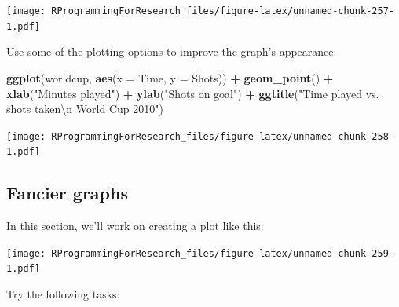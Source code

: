 \documentclass[]{book}
\makeatletter
\newenvironment{Shaded}{\begin{snugshade}}{\end{snugshade}}
\newcommand{\KeywordTok}[1]{\textcolor[rgb]{0.13,0.29,0.53}{\textbf{#1}}}
\newcommand{\DataTypeTok}[1]{\textcolor[rgb]{0.13,0.29,0.53}{#1}}
\newcommand{\CharTok}[1]{\textcolor[rgb]{0.31,0.60,0.02}{#1}}
\newcommand{\StringTok}[1]{\textcolor[rgb]{0.31,0.60,0.02}{#1}}
\newcommand{\OperatorTok}[1]{\textcolor[rgb]{0.81,0.36,0.00}{\textbf{#1}}}
\newcommand{\NormalTok}[1]{#1}
\newenvironment{kframe}{%
\medskip{}
\setlength{\fboxsep}{.8em}
 \def\at@end@of@kframe{}%
 \ifinner\ifhmode%
  \def\at@end@of@kframe{\end{minipage}}%
  \begin{minipage}{\columnwidth}%
 \fi\fi%
 \def\FrameCommand##1{\hskip\@totalleftmargin \hskip-\fboxsep
 \colorbox{shadecolor}{##1}\hskip-\fboxsep
     \hskip-\linewidth \hskip-\@totalleftmargin \hskip\columnwidth}%
 \MakeFramed {\advance\hsize-\width
   \@totalleftmargin\z@ \linewidth\hsize
   \@setminipage}}%
 {\par\unskip\endMakeFramed%
 \at@end@of@kframe}
\renewenvironment{Shaded}{\begin{kframe}}{\end{kframe}}
\theoremstyle{definition}
\theoremstyle{definition}
\theoremstyle{definition}
\theoremstyle{remark}
\makeatother
\begin{document}
\texttt{[image: RProgrammingForResearch\_files/figure-latex/unnamed-chunk-257-1.pdf]}

Use some of the plotting options to improve the graph's appearance:

\begin{Shaded}
\begin{Highlighting}[]
\KeywordTok{ggplot}\NormalTok{(worldcup, }\KeywordTok{aes}\NormalTok{(}\DataTypeTok{x =}\NormalTok{ Time, }\DataTypeTok{y =}\NormalTok{ Shots)) }\OperatorTok{+}\StringTok{ }
\StringTok{  }\KeywordTok{geom_point}\NormalTok{() }\OperatorTok{+}\StringTok{ }
\StringTok{  }\KeywordTok{xlab}\NormalTok{(}\StringTok{"Minutes played"}\NormalTok{) }\OperatorTok{+}\StringTok{ }
\StringTok{  }\KeywordTok{ylab}\NormalTok{(}\StringTok{"Shots on goal"}\NormalTok{) }\OperatorTok{+}\StringTok{ }
\StringTok{  }\KeywordTok{ggtitle}\NormalTok{(}\StringTok{"Time played vs. shots taken}\CharTok{\textbackslash{}n}\StringTok{ World Cup 2010"}\NormalTok{)}
\end{Highlighting}
\end{Shaded}

\texttt{[image: RProgrammingForResearch\_files/figure-latex/unnamed-chunk-258-1.pdf]}

\subsection{Fancier graphs}\label{fancier-graphs}

In this section, we'll work on creating a plot like this:

\texttt{[image: RProgrammingForResearch\_files/figure-latex/unnamed-chunk-259-1.pdf]}

Try the following tasks:
\end{document}

